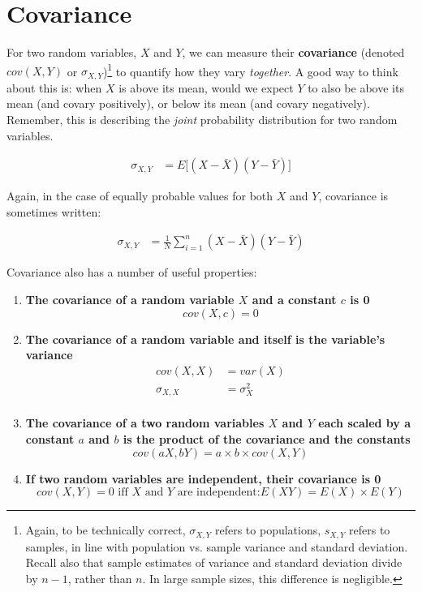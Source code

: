 \documentclass{article}
\begin{document}
\section{Covariance}

For two random variables, $X$ and $Y$, we can measure their \textbf{covariance} (denoted $cov(X,Y)$ or $\sigma_{X,Y}$)\footnote{Again, to be technically correct, $\sigma_{X,Y}$ refers to populations, $s_{X,Y}$ refers to samples, in line with population vs. sample variance and standard deviation. Recall also that sample estimates of variance and standard deviation divide by $n-1$, rather than $n$. In large sample sizes, this difference is negligible.} to quantify how they vary \emph{together}. A good way to think about this is: when $X$ is above its mean, would we expect $Y$ to also be above its mean (and covary positively), or below its mean (and covary negatively). Remember, this is describing the \emph{joint} probability distribution for two random variables. 

\begin{align*}
\sigma_{X,Y}&=E\big[(X-\bar{X})(Y-\bar{Y})\big]
\end{align*}

Again, in the case of equally probable values for both $X$ and $Y$, covariance is sometimes written:

\begin{align*}
\sigma_{X,Y}&=\frac{1}{N}\sum_{i=1}^n(X-\bar{X})(Y-\bar{Y})
\end{align*}

Covariance also has a number of useful properties:
\begin{enumerate}
	\item \textbf{The covariance of a random variable $X$ and a constant $c$ is 0}
	\begin{equation*}
	cov(X,c)=0	
	\end{equation*}
	\item \textbf{The covariance of a random variable and itself is the variable's variance}
	\begin{align*}
	cov(X,X)&=var(X)\\
	\sigma_{X,X}&=\sigma^2_X\\
	\end{align*}
	\item \textbf{The covariance of a two random variables $X$ and $Y$ each scaled by a constant $a$ and $b$ is the product of the covariance and the constants}
	\begin{equation*}
		cov(aX,bY)=a\times b \times cov(X,Y)
	\end{equation*}
	\item \textbf{If two random variables are independent, their covariance is 0}
	\begin{equation*}
		cov(X,Y)=0 \text{ iff } X \text{ and } Y \text{ are independent:}  E(XY)=E(X)\times E(Y)
	\end{equation*}
\end{enumerate}
\end{document}
